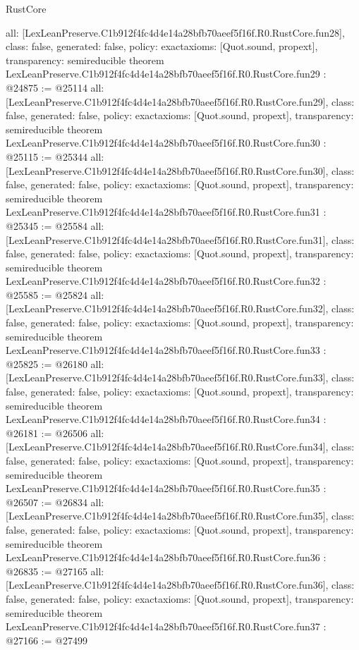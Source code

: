 \begin{lexlean}{RustCore}
\begin{coremodule}
{  all: [LexLeanPreserve.C1b912f4fc4d4e14a28bfb70aeef5f16f.R0.RustCore.fun28],
  class: false,
  generated: false,
  policy: exact{axioms: [Quot.sound, propext]},
  transparency: semireducible
}
theorem LexLeanPreserve.C1b912f4fc4d4e14a28bfb70aeef5f16f.R0.RustCore.fun29 : @24875 := @25114 {
  all: [LexLeanPreserve.C1b912f4fc4d4e14a28bfb70aeef5f16f.R0.RustCore.fun29],
  class: false,
  generated: false,
  policy: exact{axioms: [Quot.sound, propext]},
  transparency: semireducible
}
theorem LexLeanPreserve.C1b912f4fc4d4e14a28bfb70aeef5f16f.R0.RustCore.fun30 : @25115 := @25344 {
  all: [LexLeanPreserve.C1b912f4fc4d4e14a28bfb70aeef5f16f.R0.RustCore.fun30],
  class: false,
  generated: false,
  policy: exact{axioms: [Quot.sound, propext]},
  transparency: semireducible
}
theorem LexLeanPreserve.C1b912f4fc4d4e14a28bfb70aeef5f16f.R0.RustCore.fun31 : @25345 := @25584 {
  all: [LexLeanPreserve.C1b912f4fc4d4e14a28bfb70aeef5f16f.R0.RustCore.fun31],
  class: false,
  generated: false,
  policy: exact{axioms: [Quot.sound, propext]},
  transparency: semireducible
}
theorem LexLeanPreserve.C1b912f4fc4d4e14a28bfb70aeef5f16f.R0.RustCore.fun32 : @25585 := @25824 {
  all: [LexLeanPreserve.C1b912f4fc4d4e14a28bfb70aeef5f16f.R0.RustCore.fun32],
  class: false,
  generated: false,
  policy: exact{axioms: [Quot.sound, propext]},
  transparency: semireducible
}
theorem LexLeanPreserve.C1b912f4fc4d4e14a28bfb70aeef5f16f.R0.RustCore.fun33 : @25825 := @26180 {
  all: [LexLeanPreserve.C1b912f4fc4d4e14a28bfb70aeef5f16f.R0.RustCore.fun33],
  class: false,
  generated: false,
  policy: exact{axioms: [Quot.sound, propext]},
  transparency: semireducible
}
theorem LexLeanPreserve.C1b912f4fc4d4e14a28bfb70aeef5f16f.R0.RustCore.fun34 : @26181 := @26506 {
  all: [LexLeanPreserve.C1b912f4fc4d4e14a28bfb70aeef5f16f.R0.RustCore.fun34],
  class: false,
  generated: false,
  policy: exact{axioms: [Quot.sound, propext]},
  transparency: semireducible
}
theorem LexLeanPreserve.C1b912f4fc4d4e14a28bfb70aeef5f16f.R0.RustCore.fun35 : @26507 := @26834 {
  all: [LexLeanPreserve.C1b912f4fc4d4e14a28bfb70aeef5f16f.R0.RustCore.fun35],
  class: false,
  generated: false,
  policy: exact{axioms: [Quot.sound, propext]},
  transparency: semireducible
}
theorem LexLeanPreserve.C1b912f4fc4d4e14a28bfb70aeef5f16f.R0.RustCore.fun36 : @26835 := @27165 {
  all: [LexLeanPreserve.C1b912f4fc4d4e14a28bfb70aeef5f16f.R0.RustCore.fun36],
  class: false,
  generated: false,
  policy: exact{axioms: [Quot.sound, propext]},
  transparency: semireducible
}
theorem LexLeanPreserve.C1b912f4fc4d4e14a28bfb70aeef5f16f.R0.RustCore.fun37 : @27166 := @27499 {
}
\end{coremodule}
\end{lexlean}
